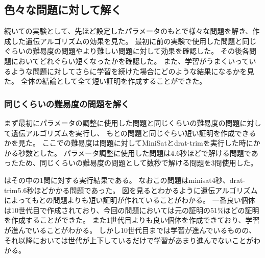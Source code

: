







\subsection{色々な問題に対して解く}%



続いての実験として、先ほど設定したパラメータのもとで様々な問題を解き、作成した遺伝アルゴリズムの効果を見た。
最初に前の実験で使用した問題と同じぐらいの難易度の問題やより難しい問題に対して効果を確認した。
その後各問題においてどれぐらい短くなったかを確認した。
また、学習がうまくいっているような問題に対してさらに学習を続けた場合にどのような結果になるかを見た。
全体の結論として全て短い証明を作成することができた。



\subsubsection{同じくらいの難易度の問題を解く}

まず最初にパラメータの調整に使用した問題と同じくらいの難易度の問題に対して遺伝アルゴリズムを実行し、
もとの問題と同じぐらい短い証明を作成できるかを見た。
ここでの難易度は問題に対してMiniSatとdrat-trimを実行した時にかかる秒数とした。
パラメータ調整に使用した問題は4.6秒ほどで解ける問題であったため、同じくらいの難易度の問題として数秒で解ける問題を3問使用した。


はその中の1問に対する実行結果である。
なおこの問題はminisat4秒、drat-trim5.6秒ほどかかる問題であった。
図を見るとわかるように遺伝アルゴリズムによってもとの問題よりも短い証明が作れていることがわかる。
一番良い個体は10世代目で作成されており、今回の問題においては元の証明の51\%ほどの証明を作成することができた。
また1世代目よりも良い個体を作成できており、学習が進んでいることがわかる。
しかし10世代目までは学習が進んでいるものの、それ以降においては世代が上下しているだけで学習があまり進んでないことがわかる。



